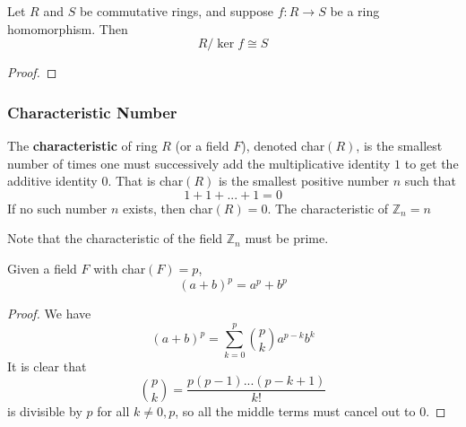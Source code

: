     \begin{theorem}
      Let $R$ and $S$ be commutative rings, and suppose $f: R \rightarrow S$ be a ring homomorphism. Then 
      \begin{equation}
        R /\ker{f} \cong S
      \end{equation}
    \end{theorem}
    \begin{proof}
      
    \end{proof}

  \subsubsection{Characteristic Number}

    \begin{definition}
      The \textbf{characteristic} of ring $R$ (or a field $F$), denoted char$(R)$, is the smallest number of times one must successively add the multiplicative identity $1$ to get the additive identity $0$. That is char$(R)$ is the smallest positive number $n$ such that 
      \begin{equation}
        1 + 1 + ... + 1 = 0 
      \end{equation}
      If no such number $n$ exists, then char$(R) = 0$. The characteristic of $\mathbb{Z}_n = n$
    \end{definition}

    Note that the characteristic of the field $\mathbb{Z}_n$ must be prime. 

    \begin{theorem}
      Given a field $F$ with char$(F) = p$, 
      \begin{equation}
        (a + b)^p = a^p + b^p
      \end{equation}
    \end{theorem}
    \begin{proof}
      We have 
      \begin{equation}
        (a + b)^p = \sum_{k = 0}^p \binom{p}{k} a^{p-k} b^{k}
      \end{equation}
      It is clear that 
      \begin{equation}
        \binom{p}{k} = \frac{p (p-1) ... (p - k+1)}{k!}
      \end{equation}
      is divisible by $p$ for all $k \neq 0, p$, so all the middle terms must cancel out to $0$. 
    \end{proof}

